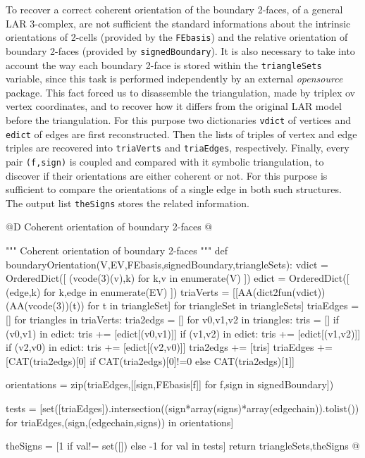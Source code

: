 \documentclass[11pt,oneside]{article}    %
\begin{document}
To recover a correct coherent orientation of the boundary 2-faces, of a general LAR 3-complex, are not sufficient the standard informations about the intrinsic orientations of 2-cells (provided by the \texttt{FEbasis}) and the relative orientation of boundary 2-faces (provided by \texttt{signedBoundary}). It is also necessary to take into account the way each boundary 2-face is stored within the \texttt{triangleSets} variable, since this task is performed independently by an external \emph{opensource} package. This fact forced us to disassemble the triangulation, made by triplex ov vertex coordinates, and to recover how it differs from the original LAR model before the triangulation. For this purpose two dictionaries \texttt{vdict} of vertices and \texttt{edict} of edges are first reconstructed. Then the lists of triples of vertex and edge triples are recovered into \texttt{triaVerts} and \texttt{triaEdges}, respectively. Finally, every pair \texttt{(f,sign)} is coupled and compared with it symbolic triangulation, to discover if their orientations are either coherent or not. For this purpose is sufficient to compare the orientations of a single edge in both such structures. The output list \texttt{theSigns} stores the related information.

@D Coherent orientation of boundary 2-faces
@{""" Coherent orientation of boundary 2-faces """
def boundaryOrientation(V,EV,FEbasis,signedBoundary,triangleSets):            
    vdict = OrderedDict([ (vcode(3)(v),k) for k,v in enumerate(V)  ])
    edict = OrderedDict([ (edge,k) for k,edge in enumerate(EV) ])
    triaVerts = [[AA(dict2fun(vdict))(AA(vcode(3))(t)) for t in triangleSet] 
                 for triangleSet in triangleSets]
    triaEdges = []
    for triangles in triaVerts:
        tria2edgs = []
        for v0,v1,v2 in triangles:
            tris = []
            if (v0,v1) in edict: tris += [edict[(v0,v1)]]
            if (v1,v2) in edict: tris += [edict[(v1,v2)]]
            if (v2,v0) in edict: tris += [edict[(v2,v0)]]
            tria2edgs += [tris]
        triaEdges += [CAT(tria2edgs)[0] if CAT(tria2edgs)[0]!=0 else CAT(tria2edgs)[1]]
    
    orientations = zip(triaEdges,[[sign,FEbasis[f]] for f,sign in signedBoundary])
    
    tests = [set([triaEdges]).intersection((sign*array(signs)*array(edgechain)).tolist()) 
        for triaEdges,(sign,(edgechain,signs)) in orientations]
        
    theSigns = [1 if val!= set([]) else -1 for val in tests]
    return triangleSets,theSigns
@}
\end{document}
